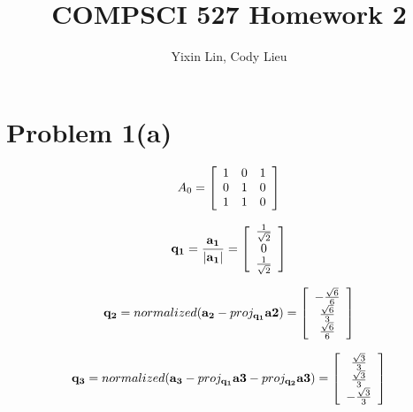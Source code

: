 \documentclass{article}
\author{Yixin Lin, Cody Lieu}
\title{COMPSCI 527 Homework 2}
\newif\ifstays
\begin{document}
\maketitle


\ifstays
\noindent [Please remove all the extra stuff below from the \verb#.tex# file before you hand in the resulting PDF file. However, please leave section headers and \verb#\newline# commands where they are. It is OK to add \verb#\newline# commands if you find that useful, but do so sparingly.

There are two ways to remove this extra stuff. One is to do so physically (look for matching \texttt{START/END}
comments), the other is to change the string \verb#\staystrue# close to the beginning of the file to \verb#\staysfalse#
\fi

\section*{Problem 1(a)}

\[
A_0 = \left[\begin{array}{*{4}c}
 1 & 0 & 1 \\
 0 & 1 & 0 \\
 1 & 1 & 0
 
 \end{array}\right]
\]


$$ \mathbf{q_1} = \frac{\mathbf{a_1}}{|\mathbf{a_1}|} =  \left[ \begin{array} {*{3}c} 
    \frac{1}{\sqrt{2}} \\
    0 \\
    \frac{1}{\sqrt{2}} \\
\end{array}\right]
$$

$$ \mathbf{q_2} = normalized(\mathbf{a_2} - proj_{\mathbf{q_1}}\mathbf{a2}) =  \left[ \begin{array} {*{3}c} 
    -\frac{\sqrt{6}}{6} \\
    \frac{\sqrt{6}}{3} \\
    \frac{\sqrt{6}}{6} \\
\end{array}\right]
$$

$$ \mathbf{q_3} = normalized(\mathbf{a_3} - proj_{\mathbf{q_1}}\mathbf{a3} -
proj_{\mathbf{q_2}}\mathbf{a3}) =  \left[ \begin{array} {*{3}c} 
    \frac{\sqrt{3}}{3} \\
    \frac{\sqrt{3}}{3} \\
    - \frac{\sqrt{3}}{3} \\
\end{array}\right]
$$
\end{document}
